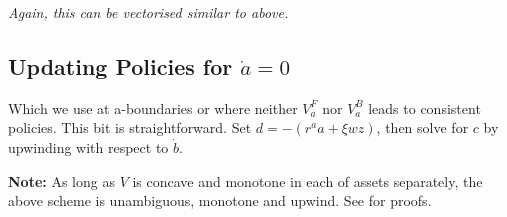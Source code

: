 \documentclass[11pt]{article}
\begin{document}
\emph{Again, this can be vectorised similar to above.}

\subsection{Updating Policies for \(\dot{a}=0\)}
\label{sec:org084458d}
Which we use at a-boundaries or where neither \(V_a^F\) nor \(V_a^B\) leads to consistent policies. This bit is straightforward. Set \(d = - (r^a a + \xi w z)\), then solve for \(c\) by upwinding with respect to \(\dot{b}\).

\textbf{Note:} As long as \(V\) is concave and monotone in each of assets separately, the above scheme is unambiguous, monotone and upwind. See \cite{achdou2022income} for proofs.


\newpage


\end{document}
